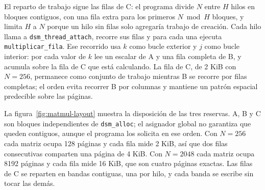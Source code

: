 El reparto de trabajo sigue las filas de C: el programa divide $N$ entre $H$ hilos en bloques contiguos, con una fila extra para los primeros $N \bmod H$ bloques, y limita $H$ a $N$ porque un hilo sin filas solo agregaría trabajo de creación. Cada hilo llama a \texttt{dsm\_thread\_attach}, recorre sus filas y para cada una ejecuta \texttt{multiplicar\_fila}. Ese recorrido usa $k$ como bucle exterior y $j$ como bucle interior: por cada valor de $k$ lee un escalar de A y una fila completa de B, y acumula sobre la fila de C que está calculando. La fila de C, de 2 KiB con $N=256$, permanece como conjunto de trabajo mientras B se recorre por filas completas; el orden evita recorrer B por columnas y mantiene un patrón espacial predecible sobre las páginas.

La figura~\ref{fig:matmul-layout} muestra la disposición de las tres reservas. A, B y C son bloques independientes de \texttt{dsm\_alloc}; el asignador global no garantiza que queden contiguos, aunque el programa los solicita en ese orden. Con $N=256$ cada matriz ocupa 128 páginas y cada fila mide 2 KiB, así que dos filas consecutivas comparten una página de 4 KiB. Con $N=2048$ cada matriz ocupa 8192 páginas y cada fila mide 16 KiB, que son cuatro páginas exactas. Las filas de C se reparten en bandas contiguas, una por hilo, y cada banda se escribe sin tocar las demás.

